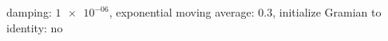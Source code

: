 damping: $\num[scientific-notation=true]{1e-06}$, exponential moving average: $\num[scientific-notation=true]{0.3}$, initialize Gramian to identity: no